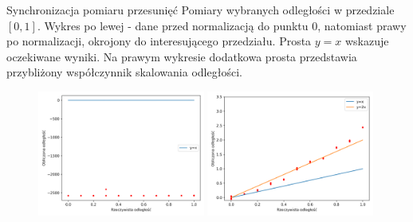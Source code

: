 \begin{frame}
    \begin{block}{Synchronizacja pomiaru przesunięć}
        Pomiary wybranych odległości w przedziale $[0,1]$. Wykres po lewej - dane przed normalizacją do punktu $0$, natomiast prawy po normalizacji, okrojony do interesującego przedziału. Prosta $y=x$ wskazuje oczekiwane wyniki. Na prawym wykresie dodatkowa prosta przedstawia przybliżony współczynnik skalowania odległości.
    \end{block}
    \begin{figure}
        \centering
        \includegraphics[width=0.49\textwidth]{../pics/time_deltas_dist/dists.png}
        \includegraphics[width=0.49\textwidth]{../pics/time_deltas_dist/dists_close.png}
    \end{figure}
\end{frame}